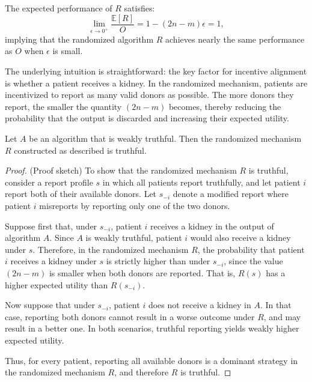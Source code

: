 The expected performance of $R$ satisfies:
\[
\lim_{\epsilon \to 0^+} \frac{\mathbb{E}[R]}{O} = 1 - (2n - m)\epsilon = 1,
\]
implying that the randomized algorithm $R$ achieves nearly the same performance as $O$ when $\epsilon$ is small.

The underlying intuition is straightforward: the key factor for incentive alignment is whether a patient receives a kidney. In the randomized mechanism, patients are incentivized to report as many valid donors as possible. The more donors they report, the smaller the quantity $(2n - m)$ becomes, thereby reducing the probability that the output is discarded and increasing their expected utility.

\begin{lemma}
Let $A$ be an algorithm that is weakly truthful. Then the randomized mechanism $R$ constructed as described is truthful.
\end{lemma}

\begin{proof}
(Proof sketch) To show that the randomized mechanism $R$ is truthful, consider a report profile $s$ in which all patients report truthfully, and let patient $i$ report both of their available donors. Let $s_{-i}$ denote a modified report where patient $i$ misreports by reporting only one of the two donors.

Suppose first that, under $s_{-i}$, patient $i$ receives a kidney in the output of algorithm $A$. Since $A$ is weakly truthful, patient $i$ would also receive a kidney under $s$. Therefore, in the randomized mechanism $R$, the probability that patient $i$ receives a kidney under $s$ is strictly higher than under $s_{-i}$, since the value $(2n - m)$ is smaller when both donors are reported. That is, $R(s)$ has a higher expected utility than $R(s_{-i})$.

Now suppose that under $s_{-i}$, patient $i$ does not receive a kidney in $A$. In that case, reporting both donors cannot result in a worse outcome under $R$, and may result in a better one. In both scenarios, truthful reporting yields weakly higher expected utility.

Thus, for every patient, reporting all available donors is a dominant strategy in the randomized mechanism $R$, and therefore $R$ is truthful.
\end{proof}

